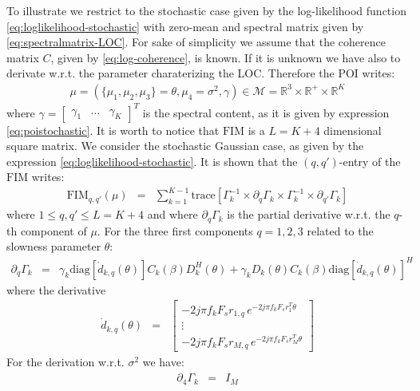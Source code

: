 \documentclass[graybox]{svmult/styles/svmult}
\def\fim{\mathrm{FIM}}
\newcommand{\diag}[1]{\mathrm{diag}\left[ #1 \right]}
\newcommand{\trace}[1]{\mathrm{trace}\left[ #1 \right]}
\begin{document}
To illustrate we restrict to the stochastic case given by the log-likelihood function \eqref{eq:loglikelihood-stochastic} with zero-mean and spectral matrix given by \eqref{eq:spectralmatrix-LOC}. For sake of simplicity we assume that the coherence matrix $C$, given by \eqref{eq:log-coherence}, is known. If it is unknown we have also to derivate w.r.t. the parameter  charaterizing the LOC. Therefore the POI writes:
 \begin{eqnarray*}
  \mu=(\{\mu_{1},\mu_{2},\mu_{3}\}=\theta,\mu_{4}=\sigma^{2},\gamma)\in\mathcal{M}= \mathds{R}^{3}\times \mathds{R}^{+}\times\mathds{R}^{K}
\end{eqnarray*} 
where $\gamma=\begin{bmatrix} \gamma_{1}&\ldots& \gamma_{K} \end{bmatrix}^{T}$ is the spectral content, as it is given by expression \eqref{eq:poistochastic}. It is worth to notice that $\fim$ is a $L=K+4$ dimensional square matrix. We consider the stochastic Gaussian case, as given by the expression \eqref{eq:loglikelihood-stochastic}. It is shown \cite{gershman2001} that the $(q,q')$-entry of the $\fim$ writes:
\begin{eqnarray}
 \label{eq:FIMgaussian}
\fim_{q,q'}(\mu)&=&\sum_{k=1}^{K-1}\trace{\Gamma_{k}^{-1}\times\partial_{q}\Gamma_{k}\times\Gamma_{k}^{-1}\times\partial_{q'}\Gamma_{k}}
\end{eqnarray}
where $1\leq q,q'\leq L=K+4$ and where $\partial_{q}\Gamma_{k}$ is 
the partial derivative w.r.t. the $q$-th component of $\mu$.  For the three first components $q=1,2,3$ related to the slowness parameter $\theta$:
\begin{eqnarray*}
\partial_{q}\Gamma_{k}&=&
   \gamma_{k}\diag{ \dot d_{k,q}(\theta)}C_{k}(\beta)D_{k}^{H}(\theta)+
   \gamma_{k} D_{k}(\theta)C_{k}(\beta) \diag{ \dot d_{k,q}(\theta)}^{H}
\end{eqnarray*}
where the derivative
\begin{eqnarray*}
 \dot d_{k,q}(\theta)&=&
  \begin{bmatrix}
  -2j\pi f_{k}F_{s} r_{1,q}\,e^{-2j\pi f_{k}F_{s}r_{1}^{T}\theta}
  \\
  \vdots
  \\
  -2j\pi f_{k}F_{s} r_{M,q}\,e^{-2j\pi f_{k}F_{s}r_{M}^{T}\theta}
  \end{bmatrix}
\end{eqnarray*}
For the derivation w.r.t. $\sigma^{2}$ we have:
\begin{eqnarray*}
\partial_{4}\Gamma_{k}&=&I_{M}
\end{eqnarray*}
\end{document}
